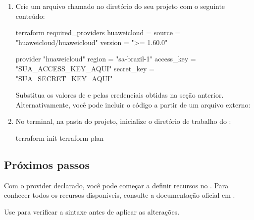 \documentclass[portuguese]{guide}
\begin{document}
\stepbystep
\begin{enumerate}
  \item Crie um arquivo chamado  no diretório do seu
        projeto com o seguinte conteúdo:

\begin{code}
terraform {
  required_providers {
    huaweicloud = {
      source  = "huaweicloud/huaweicloud"
      version = ">= 1.60.0"
    }
  }
}

provider "huaweicloud" {
  region     = "sa-brazil-1"
  access_key = "SUA_ACCESS_KEY_AQUI"
  secret_key = "SUA_SECRET_KEY_AQUI"
}
\end{code}

  Substitua os valores de  e  pelas
  credenciais obtidas na seção anterior. Alternativamente, você pode incluir
  o código a partir de um arquivo externo:


  \item No terminal, na pasta do projeto, inicialize o diretório de trabalho
        do :

\begin{code}[bash]
terraform init
terraform plan
\end{code}

\end{enumerate}

\subsection{Próximos passos}

Com o provider declarado, você pode começar a definir recursos no
. Para conhecer todos os recursos disponíveis, consulte a
documentação oficial em
.

\begin{tip}
Use  para verificar a sintaxe antes de aplicar
as alterações.
\end{tip}


\end{document}
